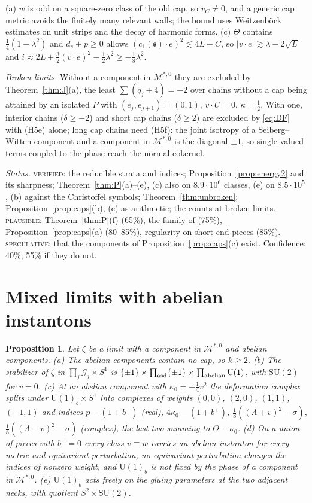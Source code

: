 \documentclass[10pt]{amsart}
\makeatletter
\numberwithin{equation}{section}
\theoremstyle{compact}
\newtheorem{proposition}[theorem]{Proposition}
\renewenvironment{proof}[1][\proofname]{\par\pushQED{\qed}\normalfont
  \topsep4\p@\relax\trivlist\item[\hskip\labelsep\itshape#1\@addpunct{.}]%
  \ignorespaces}{\popQED\endtrivlist\@endpefalse}
\newcommand{\SU}{\mathrm{SU}}
\newcommand{\fs}{\mathfrak s}
\newcommand{\cM}{\mathcal M}
\newcommand{\cG}{\mathcal G}
\newcommand{\Ms}{\cM^{*,0}}
\newcommand{\step}[1]{\par\noindent\textit{#1}\enspace}
\newcommand{\ver}{\textsc{verified}}
\newcommand{\pla}{\textsc{plausible}}
\newcommand{\spe}{\textsc{speculative}}
\makeatother
\begin{document}
\begin{proof}[Sketch]
(a) $w$ is odd on a square-zero class of the old cap, so $v_C\ne0$, and a
generic cap metric avoids the finitely many relevant walls; the bound uses
Weitzenböck estimates on unit strips and the decay of harmonic forms. (c)
$\Theta$ contains $\frac14(1-\lambda^2)$ and $d_s+p\ge0$ allows $(c_1(\fs)\cdot
e)^2\lesssim4L+C$, so $|v\cdot e|\gtrsim\lambda-2\sqrt L$ and
$i\approx2L+\frac32(v\cdot e)^2-\frac12\lambda^2\ge-\frac18\lambda^2$.
\end{proof}

\emph{Broken limits.} Without a component in $\Ms$ they are excluded by
Theorem~\ref{thm:J}(a), the least $\sum(q_j+4)=-2$ over chains without a cap
being attained by an isolated $P$ with $(e_j,e_{j+1})=(0,1)$, $v\cdot U=0$,
$\kappa=\frac12$. With one, interior chains ($\delta\ge-2$) and short cap
chains ($\delta\ge2$) are excluded by \eqref{eq:DF} with (H5e) alone; long cap
chains need (H5f): the joint isotropy of a Seiberg--Witten component and a
component in $\Ms$ is the diagonal $\pm1$, so single-valued terms coupled to
the phase reach the normal cokernel.

\step{Status.} \ver: the reducible strata and indices;
Proposition~\ref{prop:energy2} and its sharpness; Theorem~\ref{thm:P}(a)--(e),
(c) also on $8.9\cdot10^6$ classes, (e) on $8.5\cdot10^5$, (b) against the
Christoffel symbols; Theorem~\ref{thm:unbroken}; Proposition~\ref{prop:caps}(b),
(c) as arithmetic; the counts at broken limits. \pla: Theorem~\ref{thm:P}(f)
(65\%), the family of \cite[\S6]{MS} (75\%), Proposition~\ref{prop:caps}(a)
(80--85\%), regularity on short end pieces (85\%). \spe: that the components of
Proposition~\ref{prop:caps}(c) exist. Confidence: 40\%; 55\% if they do not.

\section{Mixed limits with abelian instantons}

\begin{proposition}\label{prop:mixed}
Let $\zeta$ be a limit with a component in $\Ms$ and abelian components.
\textup{(a)} The abelian components contain no cap, so $k\ge2$.
\textup{(b)} The stabilizer of $\zeta$ in $\prod_j\cG_j\times S^1$ is
$\{\pm1\}\times\prod_{\rm asd}\{\pm1\}\times\prod_{\rm abelian}\mathrm U(1)$,
with $\SU(2)$ for $v=0$. \textup{(c)} At an abelian component with
$\kappa_0=-\frac14v^2$ the deformation complex splits under $\mathrm
U(1)_b\times S^1$ into complexes of weights $(0,0)$, $(2,0)$, $(1,1)$, $(-1,1)$
and indices $p-(1+b^+)$ \textup{(}real\textup{)}, $4\kappa_0-(1+b^+)$,
$\frac18((\Lambda+v)^2-\sigma)$, $\frac18((\Lambda-v)^2-\sigma)$
\textup{(}complex\textup{)}, the last two summing to $\Theta-\kappa_0$.
\textup{(d)} On a union of pieces with $b^+=0$ every class $v\equiv w$ carries
an abelian instanton for every metric and equivariant perturbation, no
equivariant perturbation changes the indices of nonzero weight, and $\mathrm
U(1)_b$ is not fixed by the phase of a component in $\Ms$. \textup{(e)} $\mathrm
U(1)_b$ acts freely on the gluing parameters at the two adjacent necks, with
quotient $S^2\times\SU(2)$.
\end{proposition}
\end{document}
